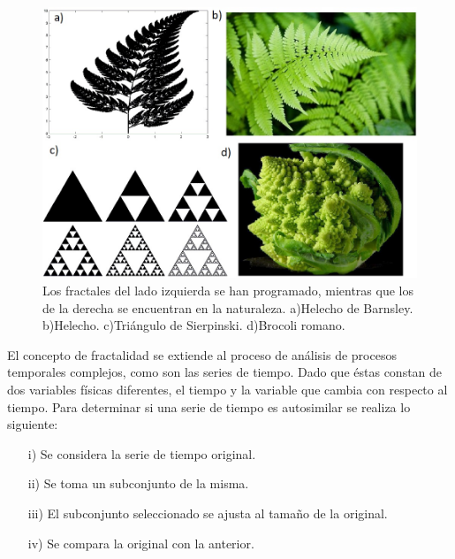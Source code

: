 \documentclass[letterpaper,titlepage,12pt,draft]{report}
\begin{document}
\begin{figure}[H]
\begin{center}
\includegraphics[scale=0.4]{fractales.jpg}
\caption{Los fractales del lado izquierda se han programado, mientras que los de la derecha se encuentran en la naturaleza. a)Helecho de Barnsley. b)Helecho. c)Tri\'angulo de Sierpinski. d)Brocoli romano.}
\label{fig:fractales}
\end{center}
\end{figure}

El concepto de fractalidad se extiende al proceso de an\'alisis de procesos temporales complejos, como son las series de tiempo. Dado que \'estas constan de dos variables f\'isicas diferentes, el tiempo y la variable que cambia con respecto al tiempo. Para determinar si una serie de tiempo es autosimilar se realiza lo siguiente:
\begin{enumerate}
\item[i)]Se considera la serie de tiempo original.
\item[ii)]Se toma un subconjunto de la misma.
\item[iii)]El subconjunto seleccionado se ajusta al tama\~no de la original.
\item[iv)]Se compara la original con la anterior.
\end{enumerate}
\end{document}

